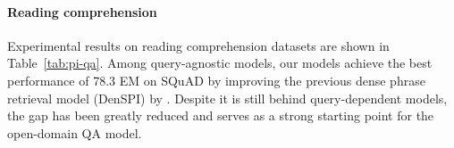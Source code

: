 \documentclass[11pt,a4paper]{article}
\newcommand{\ours}{DensePhrases}
\begin{document}
\paragraph{Reading comprehension}\label{sec:rc_result}
Experimental results on reading comprehension datasets are shown in Table~\ref{tab:pi-qa}.
Among query-agnostic models, our models achieve the best performance of 78.3 EM on SQuAD by improving the previous dense phrase retrieval model (DenSPI) by . Despite it is still behind query-dependent models, the gap has been greatly reduced and serves as a strong starting point for the open-domain QA model.





\begin{comment}
\begin{table*}[t]
    \centering
    \resizebox{2.0\columnwidth}{!}{\begin{tabular}{lccccccccccccc}
        \toprule
        \multirow{2}{1.2cm}{\textbf{Model}}& \multicolumn{6}{c}{\textbf{T-REx}} && \multicolumn{6}{c}{\textbf{ZsRE}} \\\cmidrule{2-7} \cmidrule{9-14}
        & R-Prec & Recall@5 & Accuracy & F1 & KILT-AC & KILT-F1 & & R-Prec & Recall@5 & Accuracy & F1 & KILT-AC & KILT-F1  \\
        \midrule

        BART & 0.00 & 0.00 & 45.06 & 49.24 & 0.00& 0.00 & & 0.00 & 0.00 & 9.14 & 12.21 & 0.00& 0.00 \\
        T5 &  0.00 & 0.00 & 43.56 & 50.61& 0.00 & 0.00 & & 0.00 & 0.00 & 9.02 & 13.52 & 0.00& 0.00\\
        DPR + BERT & - & - & - & - & - & - & & 40.11 & 40.11 & 6.93 & 37.28 & 4.47 & 27.09 \\
        BART + DPR & 13.26 & 17.04 & 59.16 & 62.76& 11.12 & 11.41 & & 28.90 & 39.21 & 30.43 & 34.47 & 18.91 & 20.32 \\
        RAG & 28.68 & 33.04 & \textbf{59.20} & \textbf{62.96} & 23.12 & 23.94 & & 53.73 & 59.52 & 44.74 & 49.95 & 36.83 & 39.91\\
        \midrule
        \ours~(+5K) & 34.74 & 37.07 & 52.84 & 59.99 & 25.24 & 29.48 & & \textbf{56.79} & \textbf{59.57} & \textbf{45.75} & \textbf{53.68} & \textbf{40.27} & \textbf{46.31} \\
        \ours~(+10K) & \textbf{35.68} & \textbf{38.08} & 55.16 & 61.44 & \textbf{27.60} & \textbf{30.95} & & 53.20 & 55.78 & 43.80 & 52.75 & 38.40 & 45.15 \\
        \bottomrule
    \end{tabular}
    }
    \caption{Slot filling task results on the T-REx and Zero shot RE (ZsRE) test sets.
    \label{tab:re}}
\end{table*}
\end{comment}
\end{document}
